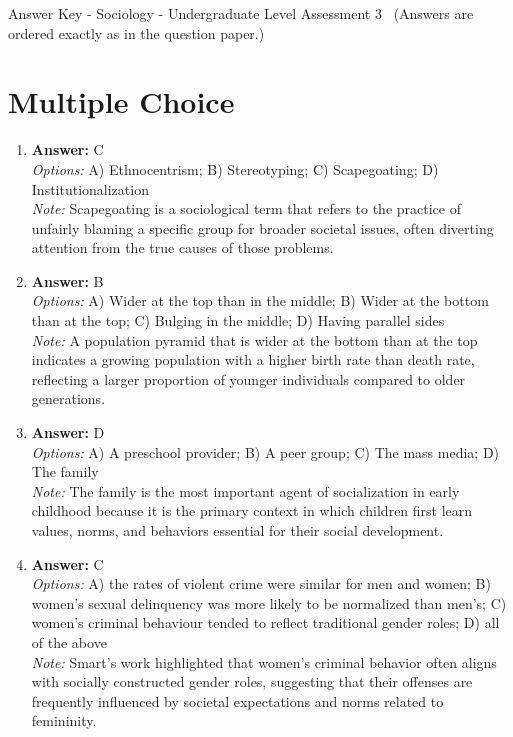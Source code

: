 \documentclass[12pt]{article}
\begin{document}
\begin{center}
Answer Key - Sociology - Undergraduate Level Assessment 3 \
\small (Answers are ordered exactly as in the question paper.)
\end{center}

\section*{Multiple Choice}
\begin{enumerate}[label=\arabic*.]
\item \textbf{Answer:} C
\\ \textit{Options:} A) Ethnocentrism; B) Stereotyping; C) Scapegoating; D) Institutionalization
\\ \textit{Note:} Scapegoating is a sociological term that refers to the practice of unfairly blaming a specific group for broader societal issues, often diverting attention from the true causes of those problems.
\item \textbf{Answer:} B
\\ \textit{Options:} A) Wider at the top than in the middle; B) Wider at the bottom than at the top; C) Bulging in the middle; D) Having parallel sides
\\ \textit{Note:} A population pyramid that is wider at the bottom than at the top indicates a growing population with a higher birth rate than death rate, reflecting a larger proportion of younger individuals compared to older generations.
\item \textbf{Answer:} D
\\ \textit{Options:} A) A preschool provider; B) A peer group; C) The mass media; D) The family
\\ \textit{Note:} The family is the most important agent of socialization in early childhood because it is the primary context in which children first learn values, norms, and behaviors essential for their social development.
\item \textbf{Answer:} C
\\ \textit{Options:} A) the rates of violent crime were similar for men and women; B) women's sexual delinquency was more likely to be normalized than men's; C) women's criminal behaviour tended to reflect traditional gender roles; D) all of the above
\\ \textit{Note:} Smart's work highlighted that women's criminal behavior often aligns with socially constructed gender roles, suggesting that their offenses are frequently influenced by societal expectations and norms related to femininity.

\end{enumerate}
\end{document}
